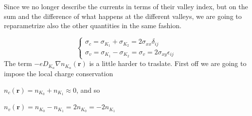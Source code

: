 Since we no longer describe the currents in terms of their valley index, but on the sum and the difference of what happens at the different valleys, we are going to reparametrize also the other quantities in the same fashion.


\begin{equation}
    \begin{cases}
        \sigma_c=\sigma_{K_1}+\sigma_{K_2}=2\sigma_{xx}\delta_{ij}\\
        \sigma_v=\sigma_{K_1}-\sigma_{K_2}=\sigma_v=2\sigma_{xy}\epsilon_{ij}
    \end{cases}
\end{equation}
The term $-eD_{K_\alpha}\nabla n_{K_\alpha}(\mathbf r)$ is a little harder to traslate. First off we are going to impose the local charge conservation

$n_c(\mathbf r)=n_{K_0}+n_{K_1}\approx 0$, and so 

$n_v(\mathbf r)=n_{K_0}-n_{K_1}=2n_{K_0}=-2n_{K_1}$

